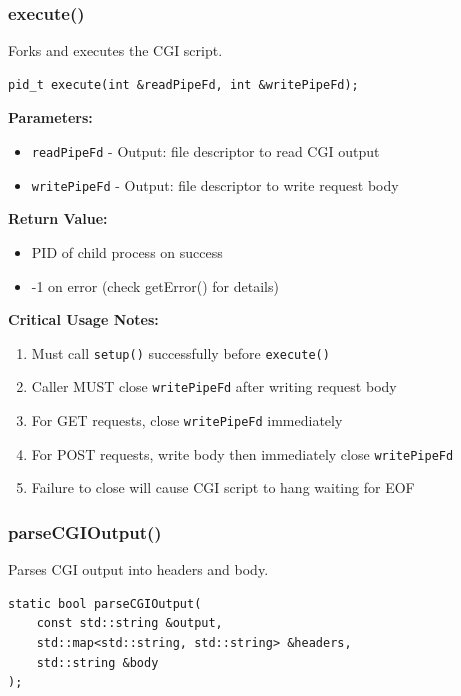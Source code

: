 \documentclass[11pt,a4paper]{article}
\begin{document}
\subsubsection{execute()}

Forks and executes the CGI script.

\begin{lstlisting}[caption=execute() Method]
pid_t execute(int &readPipeFd, int &writePipeFd);
\end{lstlisting}

\textbf{Parameters:}
\begin{itemize}
    \item \texttt{readPipeFd} - Output: file descriptor to read CGI output
    \item \texttt{writePipeFd} - Output: file descriptor to write request body
\end{itemize}

\textbf{Return Value:}
\begin{itemize}
    \item PID of child process on success
    \item -1 on error (check getError() for details)
\end{itemize}

\textbf{Critical Usage Notes:}
\begin{enumerate}
    \item Must call \texttt{setup()} successfully before \texttt{execute()}
    \item Caller MUST close \texttt{writePipeFd} after writing request body
    \item For GET requests, close \texttt{writePipeFd} immediately
    \item For POST requests, write body then immediately close \texttt{writePipeFd}
    \item Failure to close will cause CGI script to hang waiting for EOF
\end{enumerate}

\subsubsection{parseCGIOutput()}

Parses CGI output into headers and body.

\begin{lstlisting}[caption=parseCGIOutput() Static Method]
static bool parseCGIOutput(
    const std::string &output,
    std::map<std::string, std::string> &headers,
    std::string &body
);
\end{lstlisting}
\end{document}
